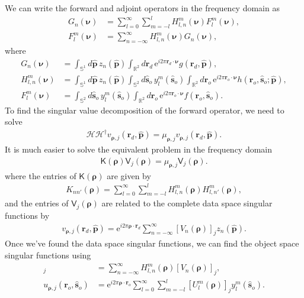 \documentclass[11pt]{article}
\newcommand{\me}{\mathrm{e}}
\providecommand{\mb}[1]{\mathbf{#1}}
\providecommand{\mc}[1]{\mathcal{#1}}
\providecommand{\ro}[1]{\mathbf{\mathbf{r}}_o}
\providecommand{\so}[1]{\mathbf{\hat{s}}_o}
\providecommand{\rd}[1]{\mathbf{r}_d}
\providecommand{\mh}[1]{\mathbf{\hat{#1}}}
\providecommand{\mbb}[1]{\mathbb{#1}}
\providecommand{\bs}[1]{\boldsymbol{#1}}
\begin{document}
We can write the forward and adjoint operators in the frequency domain as
\begin{align}
  G_n(\bs{\nu}) &= \sum_{l=0}^{\infty}\sum_{m=-l}^{l}H_{l,n}^m(\bs{\nu})F_l^m(\bs{\nu}),\label{eq:fwd}\\
  F_l^m(\bs{\nu}) &= \sum_{n=-\infty}^{\infty}H_{l,n}^m(\bs{\nu})G_n(\bs{\nu}),
\end{align}
where
\begin{align}
  G_{n}(\bs{\nu}) &= \int_{\mbb{S}^1}d\mh{p}\, z_n(\mh{p})\int_{\mbb{R}^2}d\rd{}\, \me{}^{i2\pi\rd{}\cdot\bs{\nu}}g(\rd{}, \mh{p}),\\
  H_{l,n}^m(\bs{\nu}) &= \int_{\mbb{S}^1}d\mh{p}\, z_n(\mh{p})\int_{\mbb{S}^2}d\so{}\, y_l^m(\so{})\int_{\mbb{R}^2}d\ro{}\, \me{}^{i2\pi\ro{}\cdot\bs{\nu}}h(\ro{}, \so{}; \mh{p}),\\
  F_{l}^m(\bs{\nu}) &= \int_{\mbb{S}^2}d\so{}\, y_l^m(\so{})\int_{\mbb{R}^2}d\ro{}\, \me{}^{i2\pi\ro{}\cdot\bs{\nu}}f(\ro{}, \so{}).
\end{align}
To find the singular value decomposition of the forward operator, we need to solve
\begin{align}
  \mc{H}\mc{H}^{\dagger} v_{\bs{\rho},j}(\rd{}, \hat{\mb{p}}) = \mu_{\bs{\rho},j}v_{\bs{\rho},j}(\rd{}, \hat{\mb{p}}). 
\end{align}
It is much easier to solve the equivalent problem in the frequency domain
\begin{align}
  \mathsf{K}(\bs{\rho})\mathsf{V}_j(\bs{\rho}) = \mu_{\bs{\rho},j}\mathsf{V}_j(\bs{\rho}). \label{eq:freqsvd}
\end{align}
where the entries of $\mathsf{K}(\bs{\rho})$ are given by
\begin{align}
  K_{nn'}(\bs{\rho}) = \sum_{l=0}^\infty\sum_{m=-l}^{l}H_{l,n}^m(\bs{\rho})H_{l,n'}^m(\bs{\rho}),
\end{align}
and the entries of $\mathsf{V}_j(\bs{\rho})$ are related to the complete data space singular functions by
\begin{align}
  v_{\bs{\rho},j}(\rd{}, \mh{p}) = \me{}^{i 2\pi \bs{\rho}\cdot\rd{}}\sum_{n=-\infty}^{\infty}[V_n(\bs{\rho})]_j z_n(\mh{p}). \label{eq:eigfunc}
\end{align}
Once we've found the data space singular functions, we can find the object space singular functions using
\begin{align}
  [U_l^m(\bs{\rho})]_j &= \sum_{n=-\infty}^{\infty} H_{l,n}^m(\bs{\rho})[V_n(\bs{\rho})]_j, \label{eq:eigenfuncobj}\\
  u_{\bs{\rho}, j}(\ro{}, \so{}) &= \me{}^{i2\pi\bs{\rho}\cdot\ro{}}\sum_{l=0}^{\infty}\sum_{m=-l}^l [U_l^m(\bs{\rho})]_j y_l^m(\so{}).
\end{align}
\end{document}
